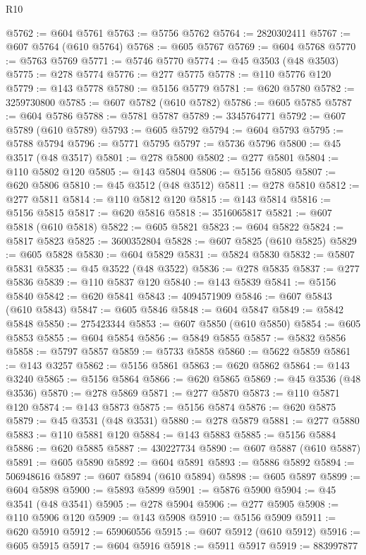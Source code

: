\begin{lexlean}{R10}
\begin{coremodule}
@5762 := @604 @5761
@5763 := @5756 @5762
@5764 := 2820302411
@5767 := @607 @5764 (@610 @5764)
@5768 := @605 @5767
@5769 := @604 @5768
@5770 := @5763 @5769
@5771 := @5746 @5770
@5774 := @45 @3503 (@48 @3503)
@5775 := @278 @5774
@5776 := @277 @5775
@5778 := @110 @5776 @120
@5779 := @143 @5778
@5780 := @5156 @5779
@5781 := @620 @5780
@5782 := 3259730800
@5785 := @607 @5782 (@610 @5782)
@5786 := @605 @5785
@5787 := @604 @5786
@5788 := @5781 @5787
@5789 := 3345764771
@5792 := @607 @5789 (@610 @5789)
@5793 := @605 @5792
@5794 := @604 @5793
@5795 := @5788 @5794
@5796 := @5771 @5795
@5797 := @5736 @5796
@5800 := @45 @3517 (@48 @3517)
@5801 := @278 @5800
@5802 := @277 @5801
@5804 := @110 @5802 @120
@5805 := @143 @5804
@5806 := @5156 @5805
@5807 := @620 @5806
@5810 := @45 @3512 (@48 @3512)
@5811 := @278 @5810
@5812 := @277 @5811
@5814 := @110 @5812 @120
@5815 := @143 @5814
@5816 := @5156 @5815
@5817 := @620 @5816
@5818 := 3516065817
@5821 := @607 @5818 (@610 @5818)
@5822 := @605 @5821
@5823 := @604 @5822
@5824 := @5817 @5823
@5825 := 3600352804
@5828 := @607 @5825 (@610 @5825)
@5829 := @605 @5828
@5830 := @604 @5829
@5831 := @5824 @5830
@5832 := @5807 @5831
@5835 := @45 @3522 (@48 @3522)
@5836 := @278 @5835
@5837 := @277 @5836
@5839 := @110 @5837 @120
@5840 := @143 @5839
@5841 := @5156 @5840
@5842 := @620 @5841
@5843 := 4094571909
@5846 := @607 @5843 (@610 @5843)
@5847 := @605 @5846
@5848 := @604 @5847
@5849 := @5842 @5848
@5850 := 275423344
@5853 := @607 @5850 (@610 @5850)
@5854 := @605 @5853
@5855 := @604 @5854
@5856 := @5849 @5855
@5857 := @5832 @5856
@5858 := @5797 @5857
@5859 := @5733 @5858
@5860 := @5622 @5859
@5861 := @143 @3257
@5862 := @5156 @5861
@5863 := @620 @5862
@5864 := @143 @3240
@5865 := @5156 @5864
@5866 := @620 @5865
@5869 := @45 @3536 (@48 @3536)
@5870 := @278 @5869
@5871 := @277 @5870
@5873 := @110 @5871 @120
@5874 := @143 @5873
@5875 := @5156 @5874
@5876 := @620 @5875
@5879 := @45 @3531 (@48 @3531)
@5880 := @278 @5879
@5881 := @277 @5880
@5883 := @110 @5881 @120
@5884 := @143 @5883
@5885 := @5156 @5884
@5886 := @620 @5885
@5887 := 430227734
@5890 := @607 @5887 (@610 @5887)
@5891 := @605 @5890
@5892 := @604 @5891
@5893 := @5886 @5892
@5894 := 506948616
@5897 := @607 @5894 (@610 @5894)
@5898 := @605 @5897
@5899 := @604 @5898
@5900 := @5893 @5899
@5901 := @5876 @5900
@5904 := @45 @3541 (@48 @3541)
@5905 := @278 @5904
@5906 := @277 @5905
@5908 := @110 @5906 @120
@5909 := @143 @5908
@5910 := @5156 @5909
@5911 := @620 @5910
@5912 := 659060556
@5915 := @607 @5912 (@610 @5912)
@5916 := @605 @5915
@5917 := @604 @5916
@5918 := @5911 @5917
@5919 := 883997877

\end{coremodule}
\end{lexlean}
